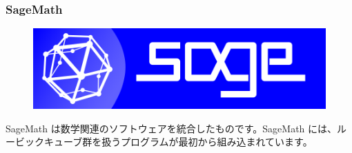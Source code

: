 \documentclass{beamer}
\begin{document}
\begin{frame}
    \frametitle{SageMath}

    \begin{figure}
        \includegraphics[scale=0.25]{images/logo_sagemath+icon_oldstyle.png}
    \end{figure}

    SageMath は数学関連のソフトウェアを統合したものです。SageMath には、ルービックキューブ群を扱うプログラムが最初から組み込まれています。
\end{frame}
\end{document}
